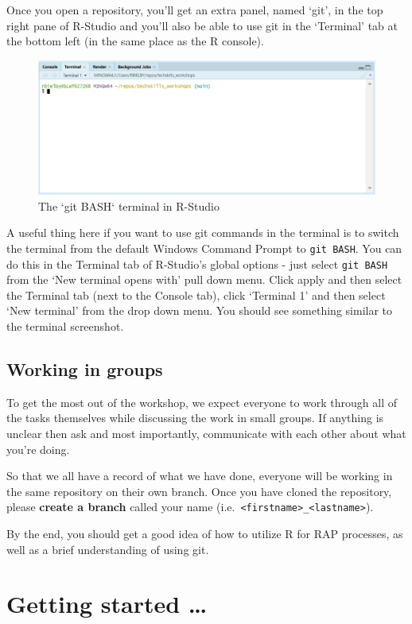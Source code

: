 \documentclass[
  12pt,
]{article}
\begin{document}
Once you open a repository, you'll get an extra panel, named `git', in
the top right pane of R-Studio and you'll also be able to use git in the
`Terminal' tab at the bottom left (in the same place as the R console).

\begin{figure}
\includegraphics[width=0.56\linewidth]{images/gitdemo/gitdemo-gitRstudio-NewTerminal} \caption{The `git BASH` terminal in R-Studio}\label{fig:unnamed-chunk-3}
\end{figure}

A useful thing here if you want to use git commands in the terminal is
to switch the terminal from the default Windows Command Prompt to
\texttt{git\ BASH}. You can do this in the Terminal tab of R-Studio's
global options - just select \texttt{git\ BASH} from the `New terminal
opens with' pull down menu. Click apply and then select the Terminal tab
(next to the Console tab), click `Terminal 1' and then select `New
terminal' from the drop down menu. You should see something similar to
the terminal screenshot.

\hypertarget{working-in-groups}{%
\subsection{Working in groups}\label{working-in-groups}}

To get the most out of the workshop, we expect everyone to work through
all of the tasks themselves while discussing the work in small groups.
If anything is unclear then ask and most importantly, communicate with
each other about what you're doing.

So that we all have a record of what we have done, everyone will be
working in the same repository on their own branch. Once you have cloned
the repository, please \textbf{create a branch} called your name
(i.e.~\texttt{\textless{}firstname\textgreater{}\_\textless{}lastname\textgreater{}}).

By the end, you should get a good idea of how to utilize R for RAP
processes, as well as a brief understanding of using git.

\newpage

\hypertarget{getting-started}{%
\section{Getting started \ldots{}}\label{getting-started}}
\end{document}
